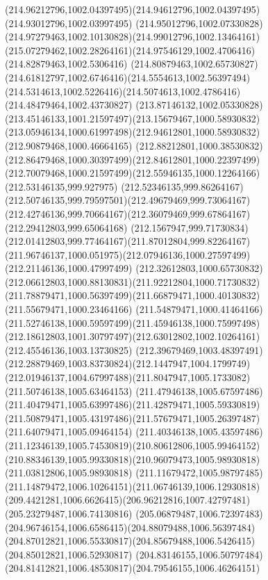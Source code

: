 {    \curveto(214.96212796,1002.04397495)(214.94612796,1002.04397495)(214.93012796,1002.03997495)
    \curveto(214.95012796,1002.07330828)(214.97279463,1002.10130828)(214.99012796,1002.13464161)
    \curveto(215.07279462,1002.28264161)(214.97546129,1002.4706416)(214.82879463,1002.5306416)
    \curveto(214.80879463,1002.65730827)(214.61812797,1002.6746416)(214.5554613,1002.56397494)
    \curveto(214.5314613,1002.5226416)(214.5074613,1002.4786416)(214.48479464,1002.43730827)
    \curveto(213.87146132,1002.05330828)(213.45146133,1001.21597497)(213.15679467,1000.58930832)
    \curveto(213.05946134,1000.61997498)(212.94612801,1000.58930832)(212.90879468,1000.46664165)
    \curveto(212.88212801,1000.38530832)(212.86479468,1000.30397499)(212.84612801,1000.22397499)
    \curveto(212.70079468,1000.21597499)(212.55946135,1000.12264166)(212.53146135,999.927975)
    \curveto(212.52346135,999.86264167)(212.50746135,999.79597501)(212.49679469,999.73064167)
    \curveto(212.42746136,999.70664167)(212.36079469,999.67864167)(212.29412803,999.65064168)
    \curveto(212.1567947,999.71730834)(212.01412803,999.77464167)(211.87012804,999.82264167)
    \curveto(211.96746137,1000.051975)(212.07946136,1000.27597499)(212.21146136,1000.47997499)
    \curveto(212.32612803,1000.65730832)(212.06612803,1000.88130831)(211.92212804,1000.71730832)
    \curveto(211.78879471,1000.56397499)(211.66879471,1000.40130832)(211.55679471,1000.23464166)
    \curveto(211.54879471,1000.41464166)(211.52746138,1000.59597499)(211.45946138,1000.75997498)
    \curveto(212.18612803,1001.30797497)(212.63012802,1002.10264161)(212.45546136,1003.13730825)
    \curveto(212.39679469,1003.48397491)(212.28879469,1003.83730824)(212.1447947,1004.1799749)
    \curveto(212.01946137,1004.67997488)(211.8047947,1005.1733082)(211.50746138,1005.63464153)
    \curveto(211.47946138,1005.67597486)(211.40479471,1005.63997486)(211.42879471,1005.59330819)
    \curveto(211.50879471,1005.43197486)(211.57679471,1005.26397487)(211.64079471,1005.09464154)
    \curveto(211.40346138,1005.43597486)(211.12346139,1005.74530819)(210.80612806,1005.99464152)
    \curveto(210.88346139,1005.99330818)(210.96079473,1005.98930818)(211.03812806,1005.98930818)
    \curveto(211.11679472,1005.98797485)(211.14879472,1006.10264151)(211.06746139,1006.12930818)
    \curveto(209.4421281,1006.6626415)(206.96212816,1007.42797481)(205.23279487,1006.74130816)
    \curveto(205.06879487,1006.72397483)(204.96746154,1006.6586415)(204.88079488,1006.56397484)
    \curveto(204.87012821,1006.55330817)(204.85679488,1006.5426415)(204.85012821,1006.52930817)
    \curveto(204.83146155,1006.50797484)(204.81412821,1006.48530817)(204.79546155,1006.46264151)
}
